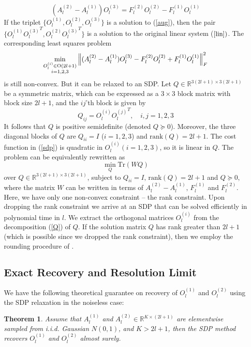 \documentclass{article}
\newtheorem{thm}{Theorem}
\begin{document}
\begin{equation}\label{aug}
(A_l^{(2)}-A_l^{(1)})O_l^{(3)}=F_l^{(2)}O_l^{(2)}-F_l^{(1)}O_l^{(1)}
\end{equation}
If the triplet $\{O_l^{(1)},O_l^{(2)},O_l^{(3)}\}$ is a solution to (\ref{aug}),
then the pair $\{O_l^{(1)}{O_l^{(3)}}^T, O_l^{(2)}{O_l^{(3)}}^T\}$
is a solution to the original linear system ($\ref{lin})$. The corresponding
least squares problem
\begin{equation}\label{sdp}
\min_{%
      \substack{%
        O_l^{(i)}\in \text{O}(2l+1) \\ i=1,2,3
}
      }
\left\|(A_l^{(2)}-A_l^{(1)})O_l^{(3)}-F_l^{(2)}O_l^{(2)}+F_l^{(1)}O_l^{(1)} \right\|_F^2
\end{equation}
is still non-convex. But it can be relaxed to an SDP. Let $Q \in
\mathbb{R}^{3(2l+1) \times 3(2l+1)}$ be a symmetric matrix, which can be
expressed as a $3 \times 3$ block matrix with block size $2l+1$, and the $ij$'th block is given by
\begin{equation}
\label{Q}
Q_{ij}=O_l^{(i)}{O_l^{(j)}}^T, \quad i,j=1,2,3
\end{equation}
It follows that $Q$ is positive semidefinite (denoted $Q \succeq 0$). Moreover, the three diagonal blocks of $Q$ are $Q_{ii}=I$ ($i=1,2,3$) and
$\text{rank}(Q)=2l+1$.
The cost
function in (\ref{sdp}) is quadratic in $O_l^{(i)} (i=1,2,3)$, so it is
linear in $Q$. The problem can be equivalently rewritten as
\begin{equation}
\min_Q \text{Tr}(WQ)
\end{equation}
over $Q \in \mathbb{R}^{3(2l+1) \times 3(2l+1)}$,
subject to $Q_{ii} = I$,  $\text{rank}(Q) = 2l+1$ and $Q \succeq 0$,
where the matrix $W$ can be written in terms of $A_l^{(2)}-A_l^{(1)}$,
$F_l^{(1)}$ and $F_l^{(2)}$. Here, we have only one non-convex constraint -- the
rank constraint. Upon dropping the rank constraint we arrive at an SDP that can be solved efficiently in
polynomial time in $l$. We extract
the orthogonal matrices
$O_l^{(i)}$ from the decomposition (\ref{Q}) of $Q$. If the
solution matrix $Q$ has rank greater than $2l+1$ (which is possible since we
dropped the rank constraint), then
we employ the rounding procedure of \cite{Cheeger}.  

\subsection{Exact Recovery and Resolution Limit}
We have the following theoretical guarantee on recovery of $O_l^{(1)}$ and $O_l^{(2)}$ using the SDP relaxation in the noiseless case:  
\begin{thm}\label{thm:recovery}
Assume that $A_l^{(1)}$ and $A_l^{(2)}\in\mathbb{R}^{K\times (2l+1)}$ are elementwise sampled from i.i.d. Gaussian $N(0,1)$, and $K>2l+1$, then the SDP method recovers $O_l^{(1)}$ and $O_l^{(2)}$ almost surely.
\end{thm}
\end{document}
